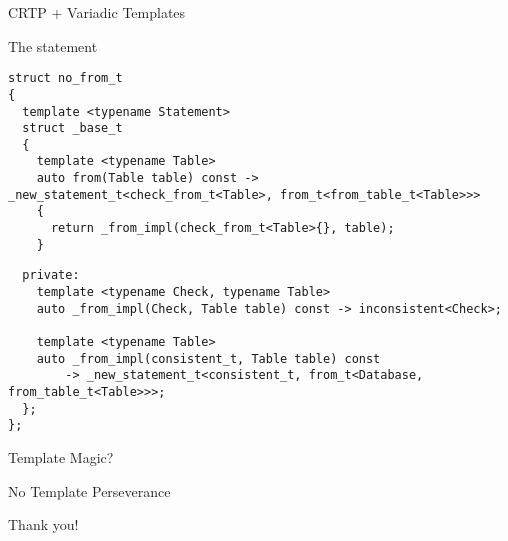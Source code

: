 \documentclass[aspectratio=169,xcolor=dvipsnames]{beamer}
\begin{document}
\begin{frame}[fragile]{CRTP + Variadic Templates}
    \begin{block}{The statement}
        \begin{lstlisting}
struct no_from_t
{
  template <typename Statement>
  struct _base_t
  {
    template <typename Table>
    auto from(Table table) const -> _new_statement_t<check_from_t<Table>, from_t<from_table_t<Table>>>
    {
      return _from_impl(check_from_t<Table>{}, table);
    }
        \end{lstlisting}
\pause
        \begin{lstlisting}
  private:
    template <typename Check, typename Table>
    auto _from_impl(Check, Table table) const -> inconsistent<Check>;

    template <typename Table>
    auto _from_impl(consistent_t, Table table) const
        -> _new_statement_t<consistent_t, from_t<Database, from_table_t<Table>>>;
  };
};
        \end{lstlisting}
    \end{block}
\end{frame}

\begin{frame}[fragile]{Template Magic?}
    \begin{block}{No}
        \pause
        Template Perseverance
    \end{block}
\end{frame}

\begin{frame}[fragile]{}
        \huge Thank you!\\
\end{frame}
\end{document}
